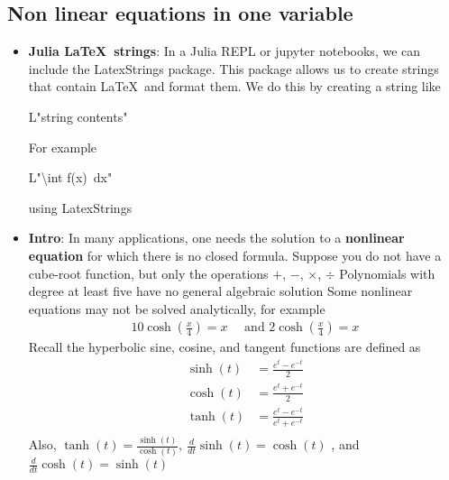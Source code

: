 \documentclass{report}
\begin{document}
    \subsection{Non linear equations in one variable}
    \begin{itemize}
        \item \textbf{Julia \LaTeX \ strings}: In a Julia REPL or jupyter notebooks, we can include the LatexStrings package. This package allows us to create strings that contain \LaTeX \ and format them. We do this by creating a string like
            \begin{center}
                L"string contents"
            \end{center}
            For example
            \begin{center}
                L"\textbackslash int f(x)\ dx"
            \end{center}
            \bigbreak \noindent 
            \begin{jlcode}
            using LatexStrings
            \end{jlcode}
        \item \textbf{Intro}: In many applications, one needs the solution to a \textbf{nonlinear equation} for which there is no closed formula.
            \bigbreak \noindent 
            Suppose you do not have a cube-root function, but only the operations $+$, $-$, $\times$, $\div$
            \bigbreak \noindent 
             Polynomials with degree at least five have no general algebraic solution
             \bigbreak \noindent 
             Some nonlinear equations may not be solved analytically, for example
             \begin{align*}
                 10\cosh{\left(\frac{x}{4}\right)} = x \quad \text{ and } 2\cosh{\left(\frac{x}{4}\right)} = x
             \end{align*}
             Recall the hyperbolic sine, cosine, and tangent functions are defined as
             \begin{align*}
                 \sinh{\left(t\right)} &= \frac{e^{t} - e^{-t}}{2} \\
                 \cosh{\left(t\right)} &= \frac{e^{t} + e^{-t}}{2} \\
                 \tanh{\left(t\right)} &= \frac{e^{t} - e^{-t}}{e^{t} + e^{-t}} \\
             \end{align*}
             Also, $\tanh{(t)} = \frac{\sinh{(t)}}{\cosh{(t)}},\ \frac{d}{dt}\sinh{(t)} = \cosh{(t)}$ , and $\frac{d}{dt}\cosh{(t)} = \sinh{(t)} $

\end{itemize}
\end{document}
